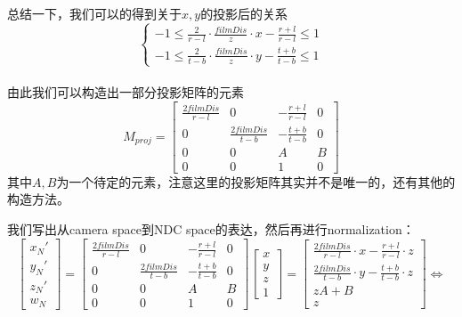 总结一下，我们可以的得到关于$x, y$的投影后的关系
\begin{displaymath}
\left\{
\begin{gathered}
-1 \leq \frac{2}{r - l}\cdot\frac{filmDis}{z}\cdot x - \frac{r + l}{r - l} \leq 1\\
-1 \leq \frac{2}{t - b}\cdot\frac{filmDis}{z}\cdot y - \frac{t + b}{t - b} \leq 1
\end{gathered}
\right.
\end{displaymath}
\\

由此我们可以构造出一部分投影矩阵的元素
\begin{displaymath}
M_{proj} = 
\begin{bmatrix}
\frac{2filmDis}{r - l} & 0  & -\frac{r + l}{r - l} & 0\\
0 & \frac{2filmDis}{t - b} & -\frac{t + b}{t - b} & 0\\
0 & 0 & A & B\\
0 & 0 & 1 & 0
\end{bmatrix}
\end{displaymath}
其中$A, B$为一个待定的元素，注意这里的投影矩阵其实并不是唯一的，还有其他的构造方法。

我们写出从camera space到NDC space的表达，然后再进行normalization：
\begin{displaymath}
\begin{bmatrix}
x_N'\\
y_N'\\
z_N'\\
w_N
\end{bmatrix} = 
\begin{bmatrix}
\frac{2filmDis}{r - l} & 0 & -\frac{r + l}{r - l} & 0\\
0 & \frac{2filmDis}{t - b} & -\frac{t + b}{t - b} & 0\\
0 & 0 & A & B\\
0 & 0 & 1 & 0
\end{bmatrix}
\begin{bmatrix}
x\\
y\\
z\\
1
\end{bmatrix} =
\left[\begin{gathered}
\frac{2filmDis}{r - l}\cdot x - \frac{r + l}{r - l} \cdot z\\
\frac{2filmDis}{t - b} \cdot y - \frac{t + b}{t - b}\cdot z\\
zA + B\\
z
\end{gathered}\right]\Leftrightarrow
\end{displaymath}

